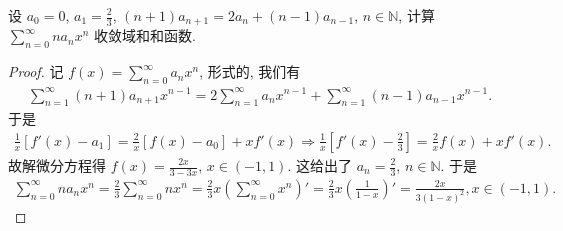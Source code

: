 \documentclass[../../main.tex]{subfiles}
\begin{document}
\begin{example}
设 $a_0 = 0$, $a_1 = \frac{2}{3}$, $(n + 1)a_{n+1} = 2a_n + (n - 1)a_{n-1}$, $n \in \mathbb{N}$, 计算 $\sum_{n=0}^{\infty} n a_n x^n$ 收敛域和和函数.
\end{example}
\begin{proof}
记 $f(x) = \sum_{n=0}^{\infty} a_n x^n$, 形式的, 我们有
\begin{align*}
\sum_{n=1}^{\infty} (n + 1) a_{n+1} x^{n - 1} = 2 \sum_{n=1}^{\infty} a_n x^{n - 1} + \sum_{n=1}^{\infty} (n - 1) a_{n-1} x^{n - 1}.
\end{align*}
于是
\begin{align*}
\frac{1}{x} [f'(x) - a_1] = \frac{2}{x} [f(x) - a_0] + x f'(x) \Rightarrow \frac{1}{x} \left[ f'(x) - \frac{2}{3} \right] = \frac{2}{x} f(x) + x f'(x).
\end{align*}
故解微分方程得 $f(x) = \frac{2x}{3 - 3x}$, $x \in (-1,1)$. 这给出了 $a_n = \frac{2}{3}$, $n \in \mathbb{N}$. 于是
\begin{align*}
\sum_{n=0}^{\infty} n a_n x^n = \frac{2}{3} \sum_{n=0}^{\infty} n x^n = \frac{2}{3} x \left( \sum_{n=0}^{\infty} x^n \right)' = \frac{2}{3} x \left( \frac{1}{1 - x} \right)' = \frac{2x}{3(1 - x)^2}, x \in (-1,1).
\end{align*}
\end{proof}
\end{document}
